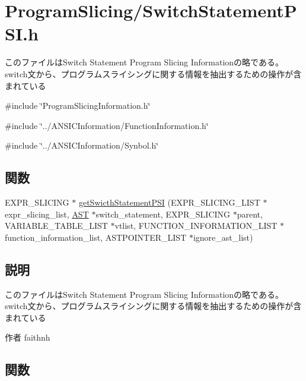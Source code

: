 \section{ProgramSlicing/SwitchStatementPSI.h}
\label{SwitchStatementPSI_8h}


このファイルはSwitch Statement Program Slicing Informationの略である。 switch文から、プログラムスライシングに関する情報を抽出するための操作が含まれている  


{\ttfamily \#include \char`\"{}ProgramSlicingInformation.h\char`\"{}}\par
{\ttfamily \#include \char`\"{}../ANSICInformation/FunctionInformation.h\char`\"{}}\par
{\ttfamily \#include \char`\"{}../ANSICInformation/Synbol.h\char`\"{}}\par
\subsection*{関数}
\begin{DoxyCompactItemize}
\item 
EXPR\_\-SLICING $\ast$ \hyperlink{SwitchStatementPSI_8h_a3f231623b7cbec9dc34949d3f7f5f6b4}{getSwicthStatementPSI} (EXPR\_\-SLICING\_\-LIST $\ast$expr\_\-slicing\_\-list, \hyperlink{structabstract__syntax__tree}{AST} $\ast$switch\_\-statement, EXPR\_\-SLICING $\ast$parent, VARIABLE\_\-TABLE\_\-LIST $\ast$vtlist, FUNCTION\_\-INFORMATION\_\-LIST $\ast$function\_\-information\_\-list, ASTPOINTER\_\-LIST $\ast$ignore\_\-ast\_\-list)
\end{DoxyCompactItemize}


\subsection{説明}
このファイルはSwitch Statement Program Slicing Informationの略である。 switch文から、プログラムスライシングに関する情報を抽出するための操作が含まれている \begin{DoxyAuthor}{作者}
faithnh 
\end{DoxyAuthor}


\subsection{関数}
